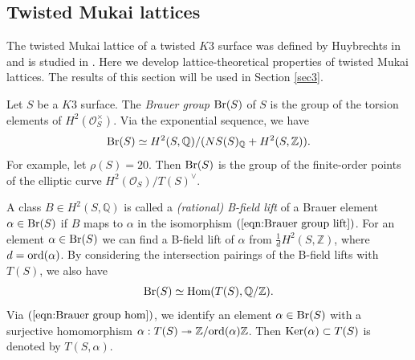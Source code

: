 \documentclass{article}
\theoremstyle{plain}
\theoremstyle{definition}
\theoremstyle{remark}
\newcommand{\Z}{{\mathbb Z}}
\newcommand{\Q}{{\mathbb Q}}
\begin{document}
\subsection{Twisted Mukai lattices}\label{sec2.2} 





The twisted Mukai lattice of a twisted $K3$ surface 
was defined by Huybrechts in \cite{Hu} 
and is studied in \cite{H-S1}. 
Here  
we develop lattice-theoretical properties of twisted Mukai lattices. 
The results of this section will be used in Section \ref{sec3}.  







Let $S$ be a $K3$ surface. 
The {\it Brauer group\/} ${\rm Br\/}(S)$ of $S$ 
is the group of the torsion elements of 
$H^{2}(\mathcal{O}_{S}^{\times})$. 
Via the exponential sequence, 
we have 
\begin{equation}\label{eqn:Brauer group lift}
{\rm Br\/}(S) 
\simeq 
H^{2}(S, {\Q}) / 
( NS(S)_{{\Q}} + H^{2}(S, {\Z})) . 
\end{equation} 
For example, 
let $\rho (S) =20$. 
Then ${\rm Br\/}(S)$ is the group of the finite-order points of 
the elliptic curve 
$H^{2}(\mathcal{O}_{S}) / T(S)^{\vee}$.  






A class $B\in H^{2}(S, {\Q})$ 
is called a {\it (rational) B-field lift\/} 
of 
a Brauer element $\alpha \in {\rm Br\/}(S)$ 
if $B$ maps to $\alpha $ in the isomorphism $(\ref{eqn:Brauer group lift})$. 
For an element $\alpha \in {\rm Br\/}(S)$ 
we can find a B-field lift of $\alpha $ 
from 
$\frac{1}{d}H^{2}(S, {\Z})$, 
where 
$d={\rm ord\/}(\alpha )$. 
By considering the intersection pairings 
of the B-field lifts 
with $T(S)$, 
we also have 
\begin{equation}\label{eqn:Brauer group hom}
{\rm Br\/}(S) 
\simeq 
{\rm Hom\/}(T(S), {\Q}/{\Z}). 
\end{equation}
Via $(\ref{eqn:Brauer group hom})$, 
we identify an element 
$\alpha \in {\rm Br\/}(S)$ 
with a surjective homomorphism 
$\alpha : T(S) \twoheadrightarrow {\Z}/{\rm ord\/}(\alpha ){\Z}$. 
Then 
${\rm Ker\/}(\alpha ) \subset T(S)$ 
is denoted by 
$T(S, \alpha )$. 
 





\end{document}
